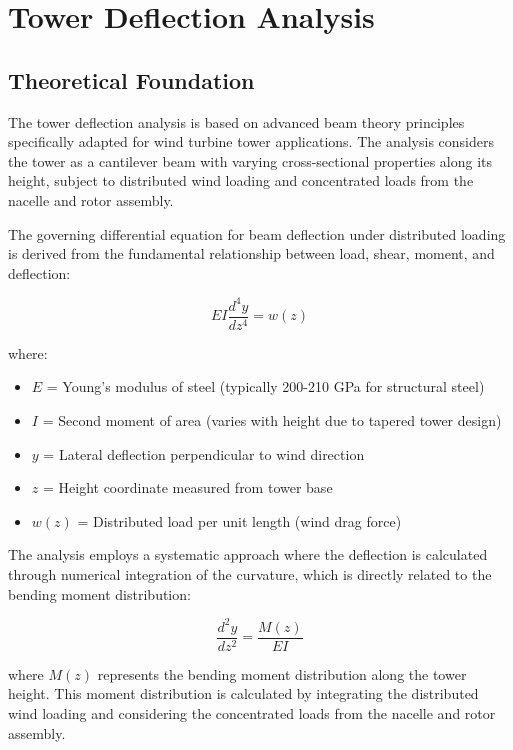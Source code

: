 \documentclass[12pt]{article}
\begin{document}
\section{Tower Deflection Analysis}

\subsection{Theoretical Foundation}

The tower deflection analysis is based on advanced beam theory principles specifically adapted for wind turbine tower applications. The analysis considers the tower as a cantilever beam with varying cross-sectional properties along its height, subject to distributed wind loading and concentrated loads from the nacelle and rotor assembly.

The governing differential equation for beam deflection under distributed loading is derived from the fundamental relationship between load, shear, moment, and deflection:

\begin{equation}
EI \frac{d^4y}{dz^4} = w(z)
\end{equation}

where:
\begin{itemize}
    \item $E$ = Young's modulus of steel (typically 200-210 GPa for structural steel)
    \item $I$ = Second moment of area (varies with height due to tapered tower design)
    \item $y$ = Lateral deflection perpendicular to wind direction
    \item $z$ = Height coordinate measured from tower base
    \item $w(z)$ = Distributed load per unit length (wind drag force)
\end{itemize}

The analysis employs a systematic approach where the deflection is calculated through numerical integration of the curvature, which is directly related to the bending moment distribution:

\begin{equation}
\frac{d^2y}{dz^2} = \frac{M(z)}{EI}
\end{equation}

where $M(z)$ represents the bending moment distribution along the tower height. This moment distribution is calculated by integrating the distributed wind loading and considering the concentrated loads from the nacelle and rotor assembly.
\end{document}
